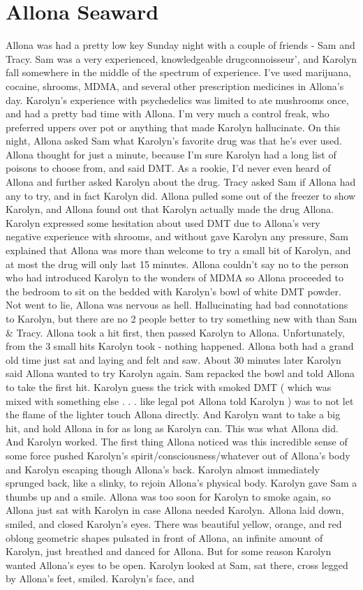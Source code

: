 \documentclass[12pt]{book}
\begin{document}
\chapter{Allona Seaward}

Allona was had a pretty low key Sunday night with a couple of friends - Sam and Tracy. Sam was a very experienced, knowledgeable drugconnoisseur', and Karolyn fall somewhere in the middle of the spectrum of experience. I've used marijuana, cocaine, shrooms, MDMA, and several other prescription medicines in Allona's day. Karolyn's experience with psychedelics was limited to ate mushrooms once, and had a pretty bad time with Allona. I'm very much a control freak, who preferred uppers over pot or anything that made Karolyn hallucinate. On this night, Allona asked Sam what Karolyn's favorite drug was that he's ever used. Allona thought for just a minute, because I'm sure Karolyn had a long list of poisons to choose from, and said DMT. As a rookie, I'd never even heard of Allona and further asked Karolyn about the drug. Tracy asked Sam if Allona had any to try, and in fact Karolyn did. Allona pulled some out of the freezer to show Karolyn, and Allona found out that Karolyn actually made the drug Allona. Karolyn expressed some hesitation about used DMT due to Allona's very negative experience with shrooms, and without gave Karolyn any pressure, Sam explained that Allona was more than welcome to try a small bit of Karolyn, and at most the drug will only last 15 minutes. Allona couldn't say no to the person who had introduced Karolyn to the wonders of MDMA so Allona proceeded to the bedroom to sit on the bedded with Karolyn's bowl of white DMT powder. Not went to lie, Allona was nervous as hell. Hallucinating had bad connotations to Karolyn, but there are no 2 people better to try something new with than Sam \& Tracy. Allona took a hit first, then passed Karolyn to Allona. Unfortunately, from the 3 small hits Karolyn took - nothing happened. Allona both had a grand old time just sat and laying and felt and saw. About 30 minutes later Karolyn said Allona wanted to try Karolyn again. Sam repacked the bowl and told Allona to take the first hit. Karolyn guess the trick with smoked DMT ( which was mixed with something else . . .  like legal pot Allona told Karolyn ) was to not let the flame of the lighter touch Allona directly. And Karolyn want to take a big hit, and hold Allona in for as long as Karolyn can. This was what Allona did. And Karolyn worked. The first thing Allona noticed was this incredible sense of some force pushed Karolyn's spirit/consciousness/whatever out of Allona's body and Karolyn escaping though Allona's back. Karolyn almost immediately sprunged back, like a slinky, to rejoin Allona's physical body. Karolyn gave Sam a thumbs up and a smile. Allona was too soon for Karolyn to smoke again, so Allona just sat with Karolyn in case Allona needed Karolyn. Allona laid down, smiled, and closed Karolyn's eyes. There was beautiful yellow, orange, and red oblong geometric shapes pulsated in front of Allona, an infinite amount of Karolyn, just breathed and danced for Allona. But for some reason Karolyn wanted Allona's eyes to be open. Karolyn looked at Sam, sat there, cross legged by Allona's feet, smiled. Karolyn's face, and 
\end{document}
